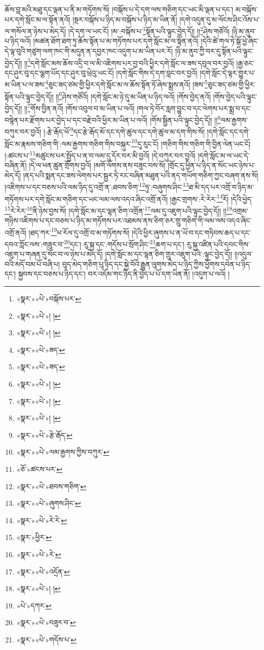 ཆོས་བླ་མའི་མཐུ་དང་ལྡན་པ་ནི་མ་གཏོགས་སོ། །བསྐོས་པ་དེ་དག་ལས་གཅིག་དང་ཡང་མི་ལྡན་པ་དང་། མ་བསྐོས་པར་དགེ་སློང་མ་ལ་སྟོན་ནའོ། །སྔར་བསྐོས་པ་ཉིད་མ་བསྐོས་པ་ཉིད་མ་ཡིན་ནོ། །དགེ་འདུན་དུ་མ་ལོངས་ཤིང་འོས་པ་ལ་གསོལ་ན་ཉེས་པ་མེད་དོ། །དེ་དག་ལ་ཡང་ངོ། །མ་:བསྐོས་པ་\footnote{«སྣར་»«པེ་»བསྐོས་པར་}སྟོན་པའི་ལྟུང་བྱེད་དོ།། །།\footnote{«སྣར་»«པེ་»། །}ཤེས་གཙོའོ། །ཉི་མ་ནུབ་པ་ཉིད་ལའོ། །མཚན་ཐོག་ཐག་ཏུ་ཆོས་སྟོན་པ་མ་གཏོགས་པར་དགེ་སློང་མ་ལ་སྟོན་ནའོ། །དེའི་ཚེ་གལ་ཏེ་སྒོ་ཕྱེ་ཞིང་དེ་ལྟ་བུའི་གཙུག་ལག་ཁང་གི་མདུན་ན་དབྱར་ཁང་འདུག་པ་མ་ཡིན་པར་རོ། །ཉི་མ་ནུབ་ཀྱི་བར་དུ་སྟོན་པའི་ལྟུང་བྱེད་དོ།། །།\footnote{«སྣར་»«པེ་»། །}དགེ་སློང་མས་ཆོས་འདྲི་བ་ལ་མི་འཇིགས་པར་བྱ་བའི་ཕྱིར་དགེ་སློང་ལ་ཟས་དབུལ་བར་བྱའོ། །རྒྱ་ཅང་དང་ཤུར་བུ་དང་ལྕག་པོད་དང་ཤུར་བུ་ཕྲེའུ་ཡང་ངོ། །དགེ་སློང་གིས་དེ་དག་བླང་བར་བྱའོ། །དགེ་སློང་དེ་ལྟར་གྱུར་པ་མ་ཡིན་པ་ལ་ཟས་\footnote{«སྣར་»«པེ་»ཟད་}ཅུང་ཟད་ཙམ་གྱི་ཕྱིར་དགེ་སློང་མ་ལ་ཆོས་སྟོན་ཏོ་ཞེས་སྨྲས་ནའོ། །ཟས་\footnote{«སྣར་»«པེ་»ཟད་}ཅུང་ཟད་ཙམ་གྱི་ཕྱིར་སྟོན་པའི་ལྟུང་བྱེད་དོ།། །།\footnote{«སྣར་»«པེ་»། །}ཤེས་གཙོའོ། །དགེ་སློང་མ་ཉེ་དུ་མ་ཡིན་པ་ཉིད་ལའོ། །གོས་བྱེད་ནའོ། །གོས་བྱེད་པའི་ལྟུང་བྱེད་དོ།། །།\footnote{«སྣར་»«པེ་»། །}གོས་བྱིན་ནའོ། །གོས་འབུལ་བ་མ་ཡིན་པ་ལའོ། །གལ་ཏེ་བོར་རླག་བྱུང་བ་དང་ལེགས་པར་སྨྲ་བ་དང་བསྙེན་པར་རྫོགས་པར་བྱེད་པ་དང་བརྗེ་བའི་ཕྱིར་མ་ཡིན་པ་ལའོ། །གོས་སྦྱིན་པའི་ལྟུང་བྱེད་དོ།། །།\footnote{«སྣར་»«པེ་»། །}ལམ་རྒྱགས་བཀུར་བར་བྱའོ། །:རྩེ་རྒོད་ཕོ་\footnote{«སྣར་»«པེ་»རྩེ་རྒོད་}དང་རྩེ་རྒོད་མོ་དང་དགེ་ཚུལ་དང་དགེ་ཚུལ་མ་དག་གིས་སོ། །དགེ་སློང་དང་དགེ་སློང་མ་རྣམས་གཅིག་གི་:ལམ་རྒྱགས་གཅིག་གིས་བསྐུར་\footnote{«སྣར་»«པེ་»ལམ་རྒྱགས་ཀྱིས་བཀུར་}དུ་རུང་ངོ། །གཅིག་གིས་གཅིག་གི་བྱིན་ལེན་ཡང་ངོ། །:ཚངས་པ་\footnote{«ཅོ་»ཚངས་པར་}མཚུངས་པར་སྤྱོད་པ་ན་བ་ལམ་དུ་དོར་བར་མི་བྱའོ། །དེ་བཀུར་བར་བྱའོ། །དགེ་སློང་མ་ལ་ཡང་དེ་བཞིན་ནོ། །དེ་ལ་ཕན་ཚུན་གྲོགས་བྱའོ། །མགོ་ལོགས་ནས་བཟུང་བས་སོ། །གྲོང་དུ་ཕྱིན་པ་ཉིད་ན་སོང་ཡང་ཉེས་པ་མེད་དོ། །ནད་པའི་སྨན་དང་ཟས་ལེགས་པར་སྦྱར་ཏེ་རང་བཞིན་མཐུན་པའི་ནད་གཡོག་གཅིག་ཀྱང་བཞག་ནས་སོ། །འཇིགས་པ་དང་བཅས་པའི་ལམ་ཉིད་དུ་འགྲོ་ན་:ཐབས་ཅིག་\footnote{«སྣར་»«པེ་»ཐབས་གཅིག་}ཏུ་:བཞུགས་ཤིང་\footnote{«སྣར་»«པེ་»ཞུགས་ཤིང་}ཐ་མི་དད་པར་འགྲོ་བ་ཉིད་མ་གཏོགས་པར་དགེ་སློང་མ་གཅིག་དང་ཡང་ལམ་ལས་འདའ་ཞིང་འགྲོ་ནའོ། །རྒྱང་གྲགས་:རེ་རེར་\footnote{«སྣར་»«པེ་»རེ་རེ་}རོ། །དེའི་ཕྱེད་\footnote{«སྣར་»ཕྱིར་}རེ་རེར་\footnote{«སྣར་»«པེ་»རེ་}ནི་ཉེས་བྱས་སོ། །དགེ་སློང་མ་དང་ལྷན་ཅིག་འགྲོན་\footnote{«སྣར་»«པེ་»འདྲོན་}ལམ་དུ་འཇུག་པའི་ལྟུང་བྱེད་དོ།། །།\footnote{«སྣར་»«པེ་»། །}འགྲམ་གཉིས་འཇིགས་པ་དང་བཅས་པ་ཉིད་མ་གཏོགས་པར་འཐམས་ནས་ཅིག་ཅར་གྲུ་གཅིག་གི་ལམ་ལས་འདའ་ཞིང་འགྲོ་ནའོ། །ཐད་ཀར་\footnote{«པེ་»དཀར་}ཕ་རོལ་དུ་འགྲོ་བ་མ་གཏོགས་སོ། །དེའི་ཕྱིར་ཞུགས་པ་ན་ཡོ་བ་དང་གཏིབས་ཆད་པ་དང་དབའ་ཀློང་ལས་:གཟུར་བ་\footnote{«སྣར་»«པེ་»བཟུར་བ་}དང་། རུ་སྐྱ་དང་:གདོས་པ་སྲོག་ཤིང་\footnote{«སྣར་»«པེ་»གདོས་པ་}ཆག་པ་དང་། རུ་སྐྱ་འཛིན་པའི་དབང་གིས་འཇུག་པ་གཞན་དུ་སོང་བ་ལ་ཉེས་པ་མེད་དོ། །དགེ་སློང་མ་དང་ལྷན་ཅིག་གྲུར་འཇུག་པའི་:ལྟུང་བྱེད་དོ།། །།འདུལ་བའི་མདོ་བམ་པོ་བཞི་པ། བུད་མེད་གཅིག་པུ་ཉིད་དང་སྐྱེ་བོའི་རྒྱུན་ལུགས་མེད་པ་ཉིད་ཀྱིས་ཕྱོགས་དབེན་པ་ཉིད་དང་། སྐྱབས་དང་བཅས་པ་ཉིད་དང་། བར་འདོམ་གང་ཉིད་ནི་བྱེད་པ་པོ་དག་ཡིན་ནོ། །འདུག་པ་ལའོ། །

